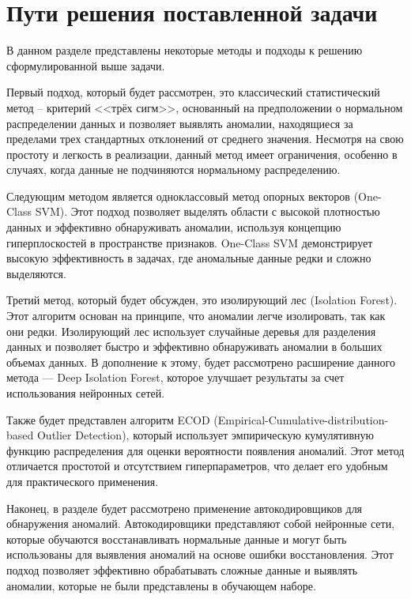 \section{Пути решения поставленной задачи}

В данном разделе представлены некоторые методы и подходы к решению сформулированной выше задачи. 

Первый подход, который будет рассмотрен, это классический статистический метод -- критерий <<трёх сигм>>, основанный на предположении о нормальном распределении данных и позволяет выявлять аномалии, находящиеся за пределами трех стандартных отклонений от среднего значения. Несмотря на свою простоту и легкость в реализации, данный метод имеет ограничения, особенно в случаях, когда данные не подчиняются нормальному распределению.

Следующим методом является одноклассовый метод опорных векторов (One-Class SVM). Этот подход позволяет выделять области с высокой плотностью данных и эффективно обнаруживать аномалии, используя концепцию гиперплоскостей в пространстве признаков. One-Class SVM демонстрирует высокую эффективность в задачах, где аномальные данные редки и сложно выделяются.

Третий метод, который будет обсужден, это изолирующий лес (Isolation Forest). Этот алгоритм основан на принципе, что аномалии легче изолировать, так как они редки. Изолирующий лес использует случайные деревья для разделения данных и позволяет быстро и эффективно обнаруживать аномалии в больших объемах данных. В дополнение к этому, будет рассмотрено расширение данного метода — Deep Isolation Forest, которое улучшает результаты за счет использования нейронных сетей.

Также будет представлен алгоритм ECOD (Empirical-Cumulative-distribution-based Outlier Detection), который использует эмпирическую кумулятивную функцию распределения для оценки вероятности появления аномалий. Этот метод отличается простотой и отсутствием гиперпараметров, что делает его удобным для практического применения.

Наконец, в разделе будет рассмотрено применение автокодировщиков для обнаружения аномалий. Автокодировщики представляют собой нейронные сети, которые обучаются восстанавливать нормальные данные и могут быть использованы для выявления аномалий на основе ошибки восстановления. Этот подход позволяет эффективно обрабатывать сложные данные и выявлять аномалии, которые не были представлены в обучающем наборе.